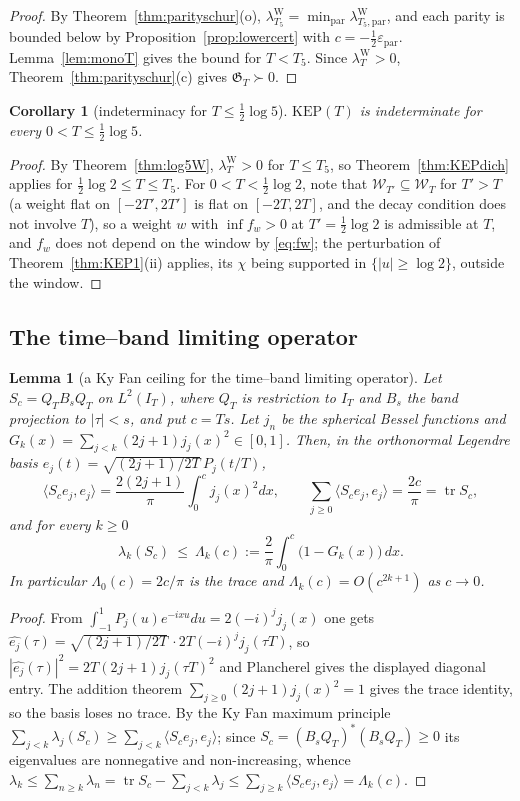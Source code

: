 \documentclass[11pt]{amsart}
\newtheorem{lemma}[theorem]{Lemma}
\newtheorem{corollary}[theorem]{Corollary}
\theoremstyle{definition}
\theoremstyle{remark}
\newcommand{\IT}{I_T}
\newcommand{\lamW}{\lambda^{\mathrm W}_T}
\newcommand{\Wcl}{\mathcal W_T}
\begin{document}
\begin{proof}
By Theorem~\ref{thm:parityschur}(o), $\lambda^{\mathrm W}_{T_5}=\min_{\mathrm{par}}\lambda^{\mathrm W}_{T_5,\mathrm{par}}$,
and each parity is bounded below by Proposition~\ref{prop:lowercert} with $c=-\frac12\varepsilon_{\mathrm{par}}$.
Lemma~\ref{lem:monoT} gives the bound for $T<T_5$. Since $\lamW>0$, Theorem~\ref{thm:parityschur}(c)
gives $\mathfrak G_T\succ0$.
\end{proof}

\begin{corollary}[indeterminacy for $T\le\frac12\log5$]\label{cor:KEPlog5}
$\mathrm{KEP}(T)$ is indeterminate for every $0<T\le\frac12\log5$.
\end{corollary}
\begin{proof}
By Theorem~\ref{thm:log5W}, $\lamW>0$ for $T\le T_5$, so Theorem~\ref{thm:KEPdich} applies for
$\frac12\log2\le T\le T_5$. For $0<T<\frac12\log2$, note that $\mathcal W_{T'}\subseteq\Wcl$ for $T'>T$ (a weight
flat on $[-2T',2T']$ is flat on $[-2T,2T]$, and the decay condition does not involve $T$), so a weight
$w$ with $\inf f_w>0$ at $T'=\frac12\log2$ is admissible at $T$, and $f_w$ does not depend on the window
by \eqref{eq:fw}; the perturbation of Theorem~\ref{thm:KEP1}(ii) applies, its $\chi$ being supported in
$\{|u|\ge\log2\}$, outside the window.
\end{proof}

\subsection{The time--band limiting operator}
\begin{lemma}[a Ky Fan ceiling for the time--band limiting operator]\label{lem:KyFan}
Let $S_c=Q_TB_sQ_T$ on $L^2(\IT)$, where $Q_T$ is restriction to $\IT$ and $B_s$ the band projection
to $|\tau|<s$, and put $c=Ts$. Let $j_n$ be the spherical Bessel functions and
$G_k(x)=\sum_{j<k}(2j+1)j_j(x)^2\in[0,1]$. Then, in the orthonormal Legendre basis
$e_j(t)=\sqrt{(2j+1)/2T}\,P_j(t/T)$,
\[
\langle S_ce_j,e_j\rangle=\frac{2(2j+1)}\pi\int_0^cj_j(x)^2dx,\qquad
\sum_{j\ge0}\langle S_ce_j,e_j\rangle=\frac{2c}\pi=\operatorname{tr}S_c ,
\]
and for every $k\ge0$
\[
\lambda_k(S_c)\ \le\ \Lambda_k(c):=\frac2\pi\int_0^c\big(1-G_k(x)\big)\,dx .
\]
In particular $\Lambda_0(c)=2c/\pi$ is the trace and $\Lambda_k(c)=O(c^{2k+1})$ as $c\to0$.
\end{lemma}
\begin{proof}
From $\int_{-1}^1P_j(u)e^{-ixu}du=2(-i)^jj_j(x)$ one gets
$\widehat{e_j}(\tau)=\sqrt{(2j+1)/2T}\,\cdot2T(-i)^jj_j(\tau T)$, so
$|\widehat{e_j}(\tau)|^2=2T(2j+1)j_j(\tau T)^2$ and Plancherel gives the displayed diagonal entry.
The addition theorem $\sum_{j\ge0}(2j+1)j_j(x)^2=1$ gives the trace identity, so the basis loses no
trace. By the Ky Fan maximum principle $\sum_{j<k}\lambda_j(S_c)\ge\sum_{j<k}\langle
S_ce_j,e_j\rangle$; since $S_c=(B_sQ_T)^*(B_sQ_T)\ge0$ its eigenvalues are nonnegative and
non-increasing, whence
$\lambda_k\le\sum_{n\ge k}\lambda_n=\operatorname{tr}S_c-\sum_{j<k}\lambda_j\le\sum_{j\ge k}\langle
S_ce_j,e_j\rangle=\Lambda_k(c)$.
\end{proof}
\end{document}
